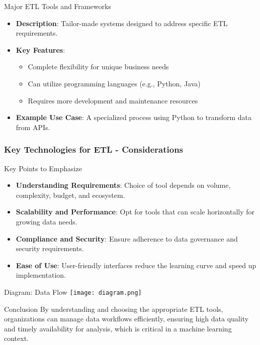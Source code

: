 \documentclass[aspectratio=169]{beamer}
\begin{document}
\begin{frame}[fragile]
\begin{block}{Major ETL Tools and Frameworks}
\begin{enumerate}
\begin{itemize}
                    \item \textbf{Description}: Tailor-made systems designed to address specific ETL requirements.
                    \item \textbf{Key Features}:
                        \begin{itemize}
                            \item Complete flexibility for unique business needs
                            \item Can utilize programming languages (e.g., Python, Java)
                            \item Requires more development and maintenance resources
                        \end{itemize}
                    \item \textbf{Example Use Case}: A specialized process using Python to transform data from APIs.
                \end{itemize}
        \end{enumerate}
    \end{block}
\end{frame}

\begin{frame}[fragile]
    \frametitle{Key Technologies for ETL - Considerations}
    \begin{block}{Key Points to Emphasize}
        \begin{itemize}
            \item \textbf{Understanding Requirements}: Choice of tool depends on volume, complexity, budget, and ecosystem.
            \item \textbf{Scalability and Performance}: Opt for tools that can scale horizontally for growing data needs.
            \item \textbf{Compliance and Security}: Ensure adherence to data governance and security requirements.
            \item \textbf{Ease of Use}: User-friendly interfaces reduce the learning curve and speed up implementation.
        \end{itemize}
    \end{block}
    
    \begin{block}{Diagram: Data Flow}
        \centering
        \texttt{[image: diagram.png]}
    \end{block}
    
    \begin{block}{Conclusion}
        By understanding and choosing the appropriate ETL tools, organizations can manage data workflows efficiently, ensuring high data quality and timely availability for analysis, which is critical in a machine learning context.
    \end{block}
\end{frame}
\end{document}
